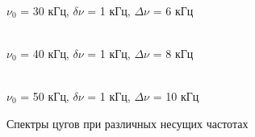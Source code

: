 \documentclass[a4paper,12pt]{article}
\begin{document}
\begin{enumerate}
\begin{figure}[h]
\begin{minipage}[h]{0.47\linewidth}
 \\ $\nu_0$ = 30 кГц, $\delta \nu$ = 1 кГц, $\Delta \nu$ = 6 кГц
\end{minipage}
\hfill
\begin{minipage}[h]{0.47\linewidth}
 \\ $\nu_0$ = 40 кГц, $\delta \nu$ = 1 кГц, $\Delta \nu$ = 8 кГц
\end{minipage}
\vfill
\begin{minipage}[h]{0.47\linewidth}
 \\ $\nu_0$ = 50 кГц, $\delta \nu$ = 1 кГц, $\Delta \nu$ = 10 кГц
\end{minipage}
\caption{Спектры цугов при различных несущих частотах}
\label{ris:experimentalcorrelationsignals4}
\end{figure}


\end{enumerate}
\end{document}

